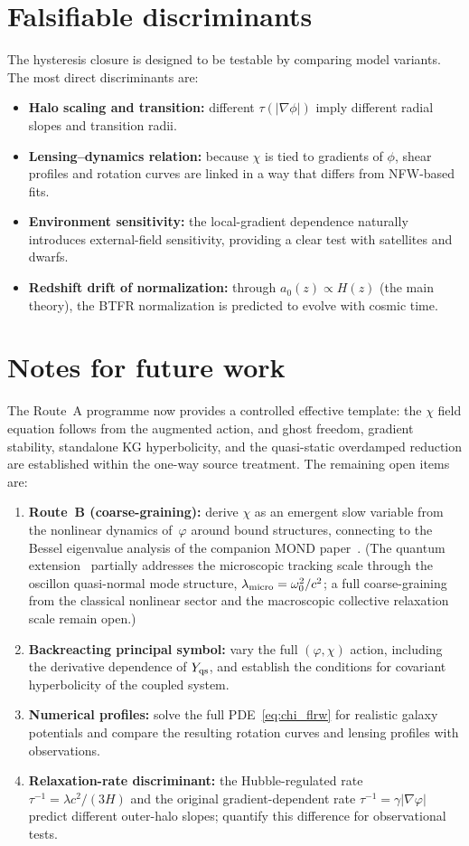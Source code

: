 \documentclass[11pt]{article}
\begin{document}
\section{Falsifiable discriminants}\label{sec:pred}
The hysteresis closure is designed to be testable by comparing model variants. The most direct discriminants are:
\begin{itemize}
\item \textbf{Halo scaling and transition:} different $\tau(|\nabla\phi|)$ imply different radial slopes and transition radii.
\item \textbf{Lensing--dynamics relation:} because $\chi$ is tied to gradients of $\phi$, shear profiles and rotation curves are linked in a way that differs from NFW-based fits.
\item \textbf{Environment sensitivity:} the local-gradient dependence naturally introduces external-field sensitivity, providing a clear test with satellites and dwarfs.
\item \textbf{Redshift drift of normalization:} through $a_0(z)\propto H(z)$ (the main theory), the BTFR normalization is predicted to evolve with cosmic time.
\end{itemize}

\section{Notes for future work}\label{sec:notes}
The Route~A programme now provides a controlled effective template:
the $\chi$ field equation follows from the augmented action, and
ghost freedom, gradient stability, standalone KG hyperbolicity, and
the quasi-static overdamped reduction are established within the
one-way source treatment.  The remaining open items are:
\begin{enumerate}
\item \textbf{Route~B (coarse-graining):} derive $\chi$
  as an emergent slow variable from the nonlinear
  dynamics of~$\varphi$ around bound structures,
  connecting to the Bessel eigenvalue analysis of
  the companion MOND paper~\cite{Lotishvili2026MOND}.  (The quantum
  extension~\cite{Lotishvili2026Q} partially addresses
  the microscopic tracking scale through the oscillon
  quasi-normal mode structure,
  $\lambda_{\rm micro} = \omega_0^2/c^2$; a full
  coarse-graining from the classical nonlinear sector and the
  macroscopic collective relaxation scale remain open.)
\item \textbf{Backreacting principal symbol:} vary the full
  $(\varphi,\chi)$ action, including the derivative dependence of
  $Y_{\rm qs}$, and establish the conditions for covariant
  hyperbolicity of the coupled system.
\item \textbf{Numerical profiles:} solve the full
  PDE~\eqref{eq:chi_flrw} for realistic galaxy
  potentials and compare the resulting rotation curves
  and lensing profiles with observations.
\item \textbf{Relaxation-rate discriminant:} the
  Hubble-regulated rate
  $\tau^{-1} = \lambda c^2/(3H)$ and the original
  gradient-dependent rate
  $\tau^{-1} = \gamma|\nabla\varphi|$ predict
  different outer-halo slopes; quantify this difference
  for observational tests.
\end{enumerate}
\end{document}
